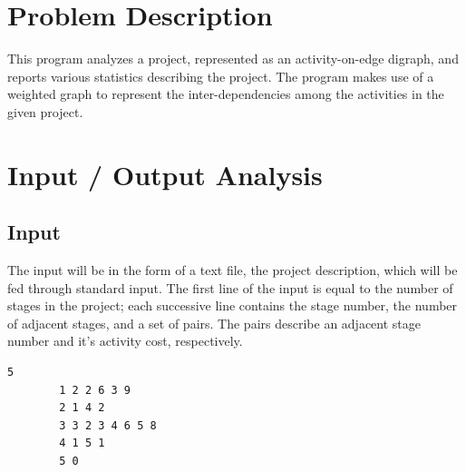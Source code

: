 

	
	
	\section{Problem Description}
	This program analyzes a project, represented as an activity-on-edge digraph, and reports various statistics describing the project. The program makes use of a weighted graph to represent the inter-dependencies among the activities in the given project.
	
	\section{Input / Output Analysis}
	\subsection{Input}
	The input will be in the form of a text file, the project description, which will be fed through standard input. The first line of the input is equal to the number of stages in the project; each successive line contains the stage number, the number of adjacent stages, and a set of pairs. The pairs describe an adjacent stage number and it's activity cost, respectively.
	
	\begin{lstlisting}[caption=Sample input]
		5
		1 2 2 6 3 9
		2 1 4 2
		3 3 2 3 4 6 5 8
		4 1 5 1
		5 0
	\end{lstlisting}
